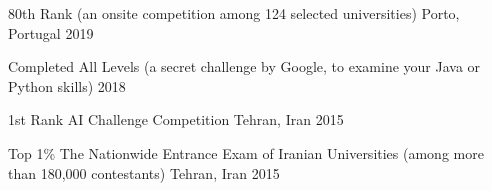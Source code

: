 

\begin{cvhonors}

  \cvhonor
    {80th Rank} %
    { (an onsite competition among 124 selected universities)} %
    {Porto, Portugal} %
    {2019} %

  \cvhonor
    {Completed All Levels} %
    { (a secret challenge by Google, to examine your Java or Python skills)} %
    {} %
    {2018} %

  \cvhonor
    {1st Rank} %
    { AI Challenge Competition} %
    {Tehran, Iran} %
    {2015} %

  \cvhonor
    {Top 1\%} %
    {The Nationwide Entrance Exam of Iranian Universities (among more than 180,000 contestants)} %
    {Tehran, Iran} %
    {2015} %


\end{cvhonors}

